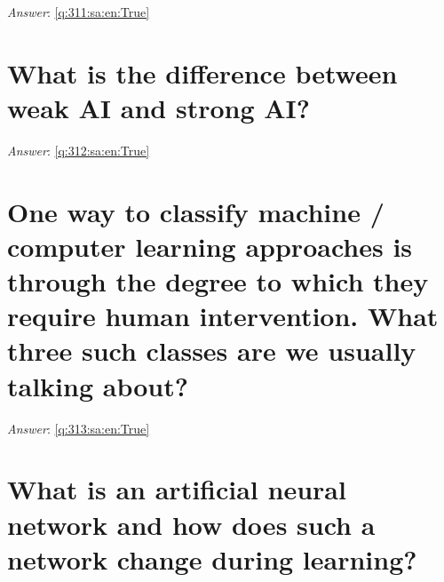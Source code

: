 \documentclass[a4paper,11pt,oneside]{book}
\begin{document}
\begin{sloppypar}
\label{q:311:sa:en:False}

\vspace{2cm}

\noindent\makebox[\textwidth]{\hrulefill}

\vspace{1cm}

\textit{Answer}: \autoref{q:311:sa:en:True}



\section{What is the difference between weak AI and strong AI?}

\label{q:312:sa:en:False}

\vspace{2cm}

\noindent\makebox[\textwidth]{\hrulefill}

\vspace{1cm}

\textit{Answer}: \autoref{q:312:sa:en:True}



\section{One way to classify machine / computer learning approaches is through the degree to which they require human intervention. What three such classes are we usually talking about?}

\label{q:313:sa:en:False}

\vspace{2cm}

\noindent\makebox[\textwidth]{\hrulefill}

\vspace{1cm}

\textit{Answer}: \autoref{q:313:sa:en:True}



\section{What is an artificial neural network and how does such a network change during learning?}

\label{q:314:sa:en:False}

\vspace{2cm}

\noindent\makebox[\textwidth]{\hrulefill}

\vspace{1cm}


\end{sloppypar}
\end{document}
